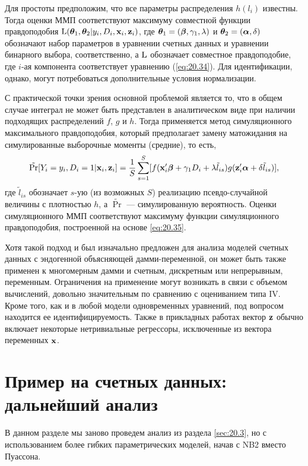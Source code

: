 Для простоты предположим, что все параметры распределения $h(l_i)$ известны. Тогда оценки ММП соответствуют максимуму совместной функции правдоподобия $\mathrm{L}(\bm{\theta}_1, \bm{\theta}_2|y_i, D_i, \mathbf{x}_i, \mathbf{z}_i)$, где $\bm{\theta}_1 = (\bm{\beta}, \gamma_1, \lambda)$ и $\bm{\theta}_2 = (\bm{\alpha}, \delta)$ обозначают набор параметров в уравнении счетных данных и уравнении бинарного выбора, соответственно, а $\mathrm{L}$ обозначает совместное правдоподобие, где $i$-ая компонента соответствует уравнению (\ref{eq:20.34}). Для идентификации, однако, могут потребоваться дополнительные условия нормализации.

С практической точки зрения основной проблемой является то, что в общем случае интеграл не может быть представлен в аналитическом виде при наличии подходящих распределений $f$, $g$ и $h$. Тогда применяется метод симуляционного максимального правдоподобия, который предполагает замену матожидания на симулированные выборочные моменты (средние), то есть,
    \begin{align}\label{eq:20.35}
    \tilde{\mathrm{Pr}}[Y_i = y_i, D_i = 1|\mathbf{x}_i, \mathbf{z}_i] = \frac{1}{S} \sum^{S}_{s = 1}[f(\mathbf{x}_i'\bm{\beta} + \gamma_1 D_i +\lambda \tilde{l}_{is})g(\mathbf{z}'_i\bm{\alpha} + \delta\tilde{l}_{is})],
    \end{align}
где $\tilde{l}_{is}$ обозначает $s$-ую (из возможных $S$) реализацию псевдо-случайной величины с плотностью $h$, а $\tilde{\Pr}$ --- симулированную вероятность. Оценки симуляционного ММП соответствуют максимуму функции симуляционного правдоподобия, построенной на основе \ref{eq:20.35}.

Хотя такой подход и был изначально предложен для анализа моделей счетных данных с эндогенной объясняющей дамми-переменной, он может быть также применен к многомерным дамми и счетным, дискретным или непрерывным, переменным. Ограничения на применение могут возникать в связи с объемом вычислений, довольно значительным по сравнению с оцениванием типа IV. Кроме того, как и в любой модели одновременных уравнений, под вопросом находится ее идентифицируемость. Также в прикладных работах вектор $\mathbf{z}$ обычно включает некоторые нетривиальные регрессоры, исключенные из вектора переменных $\mathbf{x}$.




\section{Пример на счетных данных: дальнейший анализ}\label{sec:20.7}

\noindent
В данном разделе мы заново проведем анализ из раздела \ref{sec:20.3}, но с использованием более гибких параметрических моделей, начав с NB2 вместо Пуассона.


